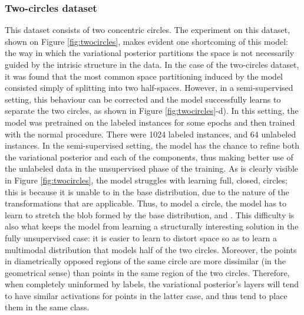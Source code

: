 \subsubsection{Two-circles dataset}
This dataset consists of two concentric circles. The experiment on this dataset,
shown on Figure \ref{fig:twocircles}, makes evident one shortcoming of this
model: the way in which the variational posterior partitions the space is
not necessarily guided by the intrisic structure in the data. In the case of
the two-circles dataset, it was found that the most common space partitioning
induced by the model consisted simply of splitting into two half-spaces. However, in
a semi-supervised setting, this behaviour can be corrected and the model
successfully learns to separate the two circles, as shown in Figure
\ref{fig:twocircles}-d). In this setting, the model was pretrained on
the labeled instances for some epochs and then trained with the normal procedure.
There were 1024 labeled instances, and 64 unlabeled instances.
In the semi-supervised setting, the model has the chance to refine both the
variational posterior and each of the components, thus making better use of
the unlabeled data in the unsupervised phase of the training. As is clearly
visible in Figure \ref{fig:twocircles}, the model struggles with
learning full, closed, circles; this is because it is unable to 
in the base distribution, due to the nature of the transformations that are
applicable. Thus, to model a circle, the model has to learn to stretch the blob
formed by the base distribution, and . This difficulty
is also what keeps the model from learning a structurally interesting solution
in the fully unsupervised case: it is easier to learn to distort space so as to
learn a multimodal distribution that models half of the two circles. Moreover,
the points in diametrically opposed regions of the same circle are more dissimilar
(in the geometrical sense) than points in the same region of the two circles.
Therefore, when completely uninformed by labels, the variational posterior's
layers will tend to have similar activations for points in the latter case, and
thus tend to place them in the same class.

